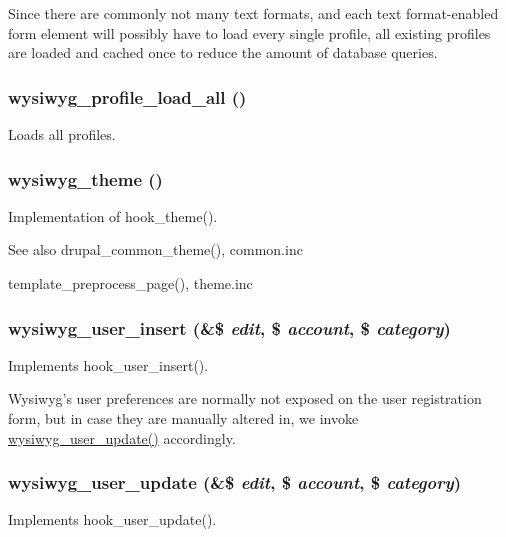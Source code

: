Since there are commonly not many text formats, and each text format-\/enabled form element will possibly have to load every single profile, all existing profiles are loaded and cached once to reduce the amount of database queries. \hypertarget{wysiwyg_8module_aa23a280b799f030dee20a62248ec4673}{
\subsubsection[{wysiwyg\_\-profile\_\-load\_\-all}]{\setlength{\rightskip}{0pt plus 5cm}wysiwyg\_\-profile\_\-load\_\-all ()}}
\label{wysiwyg_8module_aa23a280b799f030dee20a62248ec4673}
Loads all profiles. \hypertarget{wysiwyg_8module_a03b61c521946527bba7ecee753da3256}{
\subsubsection[{wysiwyg\_\-theme}]{\setlength{\rightskip}{0pt plus 5cm}wysiwyg\_\-theme ()}}
\label{wysiwyg_8module_a03b61c521946527bba7ecee753da3256}
Implementation of hook\_\-theme().

\begin{DoxySeeAlso}{See also}
drupal\_\-common\_\-theme(), common.inc 

template\_\-preprocess\_\-page(), theme.inc 
\end{DoxySeeAlso}
\hypertarget{wysiwyg_8module_aa4b0ba2dca5e44102fb46134747fc6a8}{
\subsubsection[{wysiwyg\_\-user\_\-insert}]{\setlength{\rightskip}{0pt plus 5cm}wysiwyg\_\-user\_\-insert (\&\$ {\em edit}, \/  \$ {\em account}, \/  \$ {\em category})}}
\label{wysiwyg_8module_aa4b0ba2dca5e44102fb46134747fc6a8}
Implements hook\_\-user\_\-insert().

Wysiwyg's user preferences are normally not exposed on the user registration form, but in case they are manually altered in, we invoke \hyperlink{wysiwyg_8module_aecc5eb4da6cc87d7a96613956215c80f}{wysiwyg\_\-user\_\-update()} accordingly. \hypertarget{wysiwyg_8module_aecc5eb4da6cc87d7a96613956215c80f}{
\subsubsection[{wysiwyg\_\-user\_\-update}]{\setlength{\rightskip}{0pt plus 5cm}wysiwyg\_\-user\_\-update (\&\$ {\em edit}, \/  \$ {\em account}, \/  \$ {\em category})}}
\label{wysiwyg_8module_aecc5eb4da6cc87d7a96613956215c80f}
Implements hook\_\-user\_\-update(). 